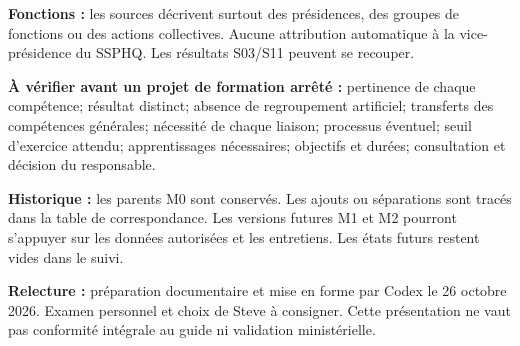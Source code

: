 \documentclass[9pt,a4paper,landscape]{extarticle}
\begin{document}
\textbf{Fonctions :} les sources décrivent surtout des présidences, des groupes de fonctions ou des actions collectives. Aucune attribution automatique à la vice-présidence du SSPHQ. Les résultats S03/S11 peuvent se recouper.\par
\textbf{À vérifier avant un projet de formation arrêté :} pertinence de chaque compétence; résultat distinct; absence de regroupement artificiel; transferts des compétences générales; nécessité de chaque liaison; processus éventuel; seuil d’exercice attendu; apprentissages nécessaires; objectifs et durées; consultation et décision du responsable.\par
\textbf{Historique :} les parents M0 sont conservés. Les ajouts ou séparations sont tracés dans la table de correspondance. Les versions futures M1 et M2 pourront s’appuyer sur les données autorisées et les entretiens. Les états futurs restent vides dans le suivi.\par
\textbf{Relecture :} préparation documentaire et mise en forme par Codex le 26 octobre 2026. Examen personnel et choix de Steve à consigner. Cette présentation ne vaut pas conformité intégrale au guide ni validation ministérielle.
\end{document}
